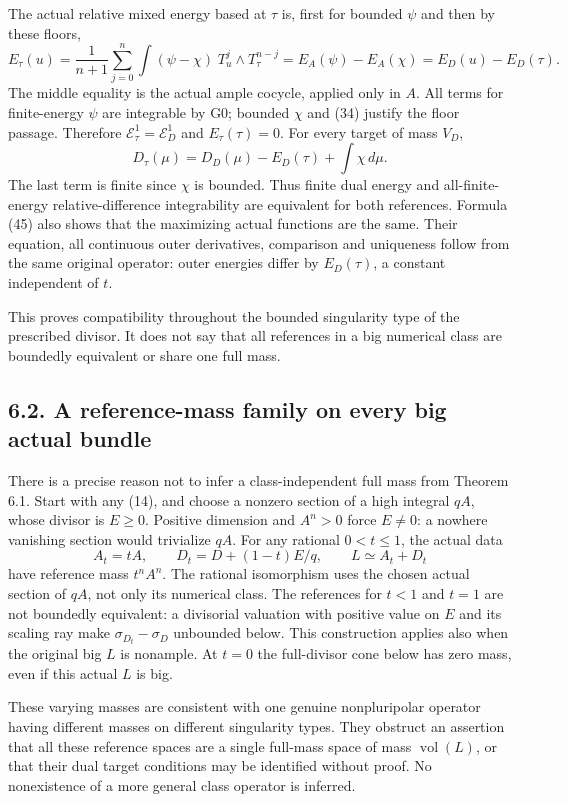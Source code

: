 \documentclass[
  10pt,
]{article}
\begin{document}
The actual relative mixed energy based at \(\tau\) is, first for bounded
\(\psi\) and then by these floors, \[E_\tau(u)=\frac1{n+1}\sum_{j=0}^n
\int(\psi-\chi)\;T_u^j\wedge T_\tau^{n-j}
=E_A(\psi)-E_A(\chi)=E_D(u)-E_D(\tau).\tag{44}\] The middle equality is
the actual ample cocycle, applied only in \(A\). All terms for
finite-energy \(\psi\) are integrable by G0; bounded \(\chi\) and (34)
justify the floor passage. Therefore
\(\mathcal E^1_\tau=\mathcal E^1_D\) and \(E_\tau(\tau)=0\). For every
target of mass \(V_D\),
\[D_\tau(\mu)=D_D(\mu)-E_D(\tau)+\int\chi\,d\mu.\tag{45}\] The last term
is finite since \(\chi\) is bounded. Thus finite dual energy and
all-finite-energy relative-difference integrability are equivalent for
both references. Formula (45) also shows that the maximizing actual
functions are the same. Their equation, all continuous outer
derivatives, comparison and uniqueness follow from the same original
operator: outer energies differ by \(E_D(\tau)\), a constant independent
of \(t\).

This proves compatibility throughout the bounded singularity type of the
prescribed divisor. It does not say that all references in a big
numerical class are boundedly equivalent or share one full mass.

\subsection{6.2. A reference-mass family on every big actual
bundle}\label{a-reference-mass-family-on-every-big-actual-bundle}

There is a precise reason not to infer a class-independent full mass
from Theorem 6.1. Start with any (14), and choose a nonzero section of a
high integral \(qA\), whose divisor is \(E\geq0\). Positive dimension
and \(A^n>0\) force \(E\ne0\): a nowhere vanishing section would
trivialize \(qA\). For any rational \(0<t\leq1\), the actual data
\[A_t=tA,\qquad D_t=D+(1-t)E/q,\qquad L\simeq A_t+D_t\tag{46}\] have
reference mass \(t^n A^n\). The rational isomorphism uses the chosen
actual section of \(qA\), not only its numerical class. The references
for \(t<1\) and \(t=1\) are not boundedly equivalent: a divisorial
valuation with positive value on \(E\) and its scaling ray make
\(\sigma_{D_t}-\sigma_D\) unbounded below. This construction applies
also when the original big \(L\) is nonample. At \(t=0\) the
full-divisor cone below has zero mass, even if this actual \(L\) is big.

These varying masses are consistent with one genuine nonpluripolar
operator having different masses on different singularity types. They
obstruct an assertion that all these reference spaces are a single
full-mass space of mass \(\operatorname{vol}(L)\), or that their dual
target conditions may be identified without proof. No nonexistence of a
more general class operator is inferred.
\end{document}
